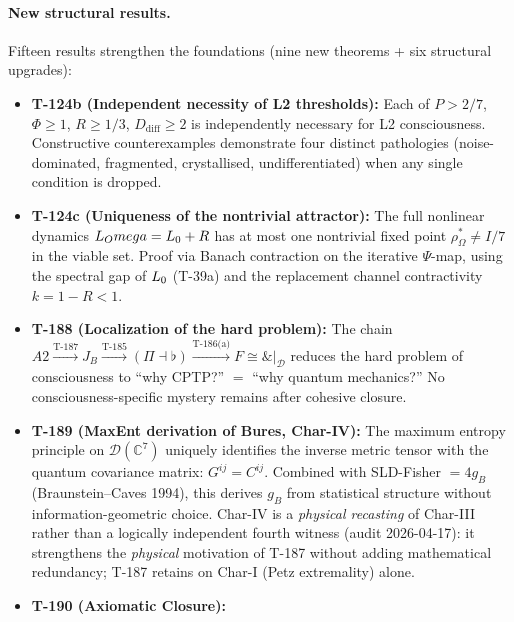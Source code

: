 \paragraph{New structural results.}
Fifteen results strengthen the foundations (nine new theorems + six structural upgrades):

\begin{itemize}[leftmargin=2em,nosep]
  \item \textbf{T-124b  (Independent necessity of L2 thresholds):}
        Each of $P > 2/7$, $\Phi \geq 1$, $R \geq 1/3$, $D_{\mathrm{diff}} \geq 2$
        is independently necessary for L2 consciousness. Constructive counterexamples
        demonstrate four distinct pathologies (noise-dominated, fragmented, crystallised,
        undifferentiated) when any single condition is dropped.
  \item \textbf{T-124c  (Uniqueness of the nontrivial attractor):}
        The full nonlinear dynamics $L_Omega = L_0 + R$ has at most
        one nontrivial fixed point $\rho^*_\Omega \neq I/7$ in the viable set. Proof via
        Banach contraction on the iterative $\Psi$-map, using the spectral gap of $L_0$
        (T-39a) and the replacement channel contractivity $k = 1 - R < 1$.
  \item \textbf{T-188  (Localization of the hard problem):}
        The chain $A2 \xrightarrow{\text{T-187}} J_B \xrightarrow{\text{T-185}} (\Pi \dashv \flat)
        \xrightarrow{\text{T-186(a)}} F \cong \&|_\mathcal{D}$ reduces the hard problem of
        consciousness to ``why CPTP?'' $=$ ``why quantum mechanics?'' No consciousness-specific
        mystery remains after cohesive closure.
  \item \textbf{T-189  (MaxEnt derivation of Bures, Char-IV):}
        The maximum entropy principle on $\mathcal{D}(\mathbb{C}^7)$ uniquely identifies the
        inverse metric tensor with the quantum covariance matrix: $G^{ij} = C^{ij}$.
        Combined with SLD-Fisher $= 4g_B$ (Braunstein--Caves 1994), this derives $g_B$
        from statistical structure without information-geometric choice. Char-IV is a
        \emph{physical recasting} of Char-III rather than a logically independent fourth
        witness (audit 2026-04-17): it strengthens the \emph{physical} motivation of
        T-187 without adding mathematical redundancy; T-187 retains  on Char-I
        (Petz extremality) alone.
  \item \textbf{T-190  (Axiomatic Closure):}

\end{itemize}
